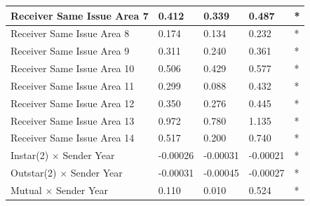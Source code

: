 \documentclass[headsepline=true, abstracton]{scrartcl}
\begin{document}
\begin{table}[htp]
\begin{tabular}{|
>{\columncolor[HTML]{EFEFEF}}l |l|l|l|l|}
Receiver Same Issue Area 7                         & 0.412                            & 0.339                               & 0.487                               & *                                    \\ \hline
Receiver Same Issue Area 8                         & 0.174                            & 0.134                               & 0.232                               & *                                    \\ \hline
Receiver Same Issue Area 9                         & 0.311                            & 0.240                               & 0.361                               & *                                    \\ \hline
Receiver Same Issue Area 10                        & 0.506                            & 0.429                               & 0.577                               & *                                    \\ \hline
Receiver Same Issue Area 11                        & 0.299                            & 0.088                               & 0.432                               & *                                    \\ \hline
Receiver Same Issue Area 12                        & 0.350                            & 0.276                               & 0.445                               & *                                    \\ \hline
Receiver Same Issue Area 13                        & 0.972                            & 0.780                               & 1.135                               & *                                    \\ \hline
Receiver Same Issue Area 14                        & 0.517                            & 0.200                               & 0.740                               & *                                    \\ \hline
Instar(2) $\times$ Sender Year                     & -0.00026                         & -0.00031                            & -0.00021                            & *                                    \\ \hline
Outstar(2) $\times$ Sender Year                    & -0.00031                         & -0.00045                            & -0.00027                            & *                                    \\ \hline
Mutual $\times$ Sender Year                        & 0.110                           & 0.010                              & 0.524                               & *                                      \\ \hline

\end{tabular}
\end{table}
\end{document}

